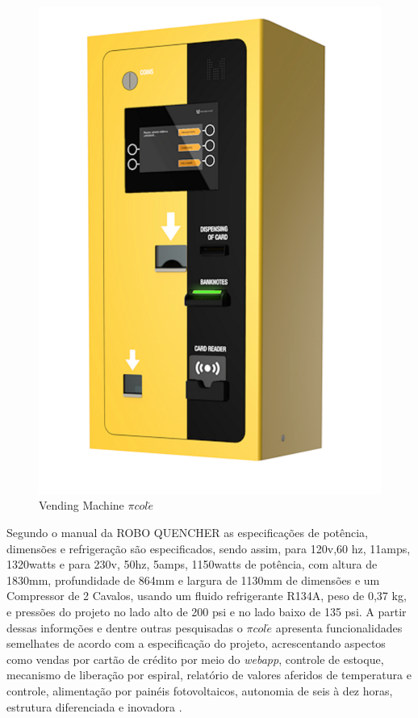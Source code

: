 \begin{figure}[H]
	\centering
    \includegraphics[scale=0.8]{figuras/vending_machine}
    \caption{Vending Machine $\pi col\acute{e}$}
    \label{fig:vending_machine}
\end{figure}

Segundo o manual da ROBO QUENCHER as especificações de potência, dimensões e refrigeração são especificados, sendo assim, para 120v,60 hz, 11amps, 1320watts e para  230v, 50hz, 5amps, 1150watts de potência, com altura de 1830mm, profundidade de 864mm e largura de 1130mm de dimensões e um Compressor de 2 Cavalos, usando um fluido refrigerante R134A, peso de 0,37 kg, e pressões do projeto no lado alto de 200 psi e no lado baixo de 135 psi. A partir dessas informções e dentre outras pesquisadas o $\pi col\acute{e}$ apresenta funcionalidades semelhates de acordo com a especificação do projeto, acrescentando aspectos como vendas por cartão de crédito por meio do \textit{webapp}, controle de estoque, mecanismo de liberação por espiral, relatório de valores aferidos de temperatura e controle, alimentação por painéis fotovoltaicos, autonomia de seis à dez horas, estrutura diferenciada e inovadora \cite{ROBOQUENCHER}.



